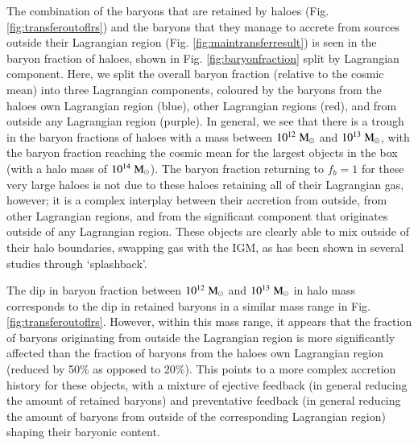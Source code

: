 The combination of the baryons that are retained by haloes (Fig.
\ref{fig:transferoutoflrs}) and the baryons that they manage to accrete from
sources outside their Lagrangian region (Fig. \ref{fig:maintransferresult})
is seen in the baryon fraction of haloes, shown in Fig.
\ref{fig:baryonfraction} split by Lagrangian component. Here, we split the
overall baryon fraction (relative to the cosmic mean) into three Lagrangian
components, coloured by the baryons from the haloes own Lagrangian region
(blue), other Lagrangian regions (red), and from outside any Lagrangian
region (purple). In general, we see that there is a trough in the baryon
fractions of haloes with a mass between $10^{12}\;{\rm M}_{\odot}{}$ and
$10^{13}\;{\rm M}_{\odot}{}$, with the baryon fraction reaching the cosmic mean for the
largest objects in the box (with a halo mass of $10^{14}\;{\rm M}_{\odot}{}$). The
baryon fraction returning to $f_b = 1$ for these very large haloes is not due
to these haloes retaining all of their Lagrangian gas, however; it is a
complex interplay between their accretion from outside, from other Lagrangian
regions, and from the significant component that originates outside of any
Lagrangian region. These objects are clearly able to mix outside of their
halo boundaries, swapping gas with the IGM, as has been shown in several
studies \cite{Mansfield2017, Diemer2017} through `splashback'.

The dip in baryon fraction between $10^{12}\;{\rm M}_{\odot}{}$ and $10^{13}\;{\rm M}_{\odot}{}$ in halo
mass corresponds to the dip in retained baryons in a similar mass range in
Fig. \ref{fig:transferoutoflrs}. However, within this mass range, it appears
that the fraction of baryons originating from outside the Lagrangian region is
more significantly affected than the fraction of baryons from the haloes own
Lagrangian region (reduced by 50\% as opposed to 20\%). This points
to a more complex accretion history for these objects, with a mixture of
ejective feedback (in general reducing the amount of retained baryons) and preventative
feedback (in general reducing the amount of baryons from outside of the
corresponding Lagrangian region) shaping their baryonic content.


